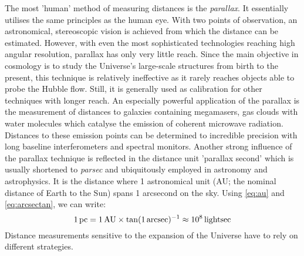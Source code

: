 The most 'human' method of measuring distances is the \textit{parallax}.  It
essentially utilises the same principles as the human eye.  With two points of
observation, an astronomical, stereoscopic vision is achieved from which the
distance can be estimated.  However, with even the most sophisticated
technologies reaching high angular resolution, parallax has only very little
reach.  Since the main objective in cosmology is to study the Universe's
large-scale structures from birth to the present, this technique is relatively
ineffective as it rarely reaches objects able to probe the Hubble flow.  Still,
it is generally used as calibration for other techniques with longer reach.  An
especially powerful application of the parallax is the measurement of distances
to galaxies containing megamasers, gas clouds with water molecules which
catalyse the emission of coherent microwave radiation.  Distances to these
emission points can be determined to incredible precision with long baseline
interferometers and spectral monitors.  Another strong influence of the parallax
technique is reflected in the distance unit 'parallax second' which is usually
shortened to \textit{parsec} and ubiquitously employed in astronomy and
astrophysics.  It is the distance where 1 astronomical unit (AU; the nominal
distance of Earth to the Sun) spans 1 arcsecond on the sky.  Using \ref{eq:au}
and \ref{eq:arcsectan}, we can write:
%
\begin{equation}%
    1\,\parsec = 1\,\AU \times \tan(1\,\arcsec)^{-1} \approx 10^{8}\,\lightsec
    \eqlbl{parsec}
\end{equation}%
%
Distance measurements sensitive to the expansion of the Universe have to rely on
different strategies.

